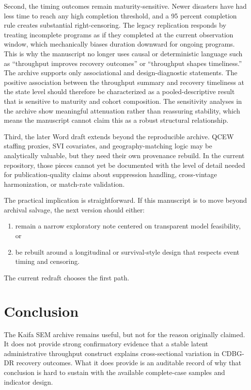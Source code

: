 \documentclass[
  letterpaper,
]{article}
\providecommand{\tightlist}{%
  \setlength{\itemsep}{0pt}\setlength{\parskip}{0pt}}
\begin{document}
Second, the timing outcomes remain maturity-sensitive. Newer disasters
have had less time to reach any high completion threshold, and a 95
percent completion rule creates substantial right-censoring. The legacy
replication responds by treating incomplete programs as if they
completed at the current observation window, which mechanically biases
duration downward for ongoing programs. This is why the manuscript no
longer uses causal or deterministic language such as ``throughput
improves recovery outcomes'' or ``throughput shapes timeliness.'' The
archive supports only associational and design-diagnostic statements.
The positive association between the throughput summary and recovery
timeliness at the state level should therefore be characterized as a
pooled-descriptive result that is sensitive to maturity and cohort
composition. The sensitivity analyses in the archive show meaningful
attenuation rather than reassuring stability, which means the manuscript
cannot claim this as a robust structural relationship.

Third, the later Word draft extends beyond the reproducible archive.
QCEW staffing proxies, SVI covariates, and geography-matching logic may
be analytically valuable, but they need their own provenance rebuild. In
the current repository, those pieces cannot yet be documented with the
level of detail needed for publication-quality claims about suppression
handling, cross-vintage harmonization, or match-rate validation.

The practical implication is straightforward. If this manuscript is to
move beyond archival salvage, the next version should either:

\begin{enumerate}
\def\labelenumi{\arabic{enumi}.}
\tightlist
\item
  remain a narrow exploratory note centered on transparent model
  feasibility, or
\item
  be rebuilt around a longitudinal or survival-style design that
  respects event timing and censoring.
\end{enumerate}

The current redraft chooses the first path.

\section{Conclusion}\label{conclusion}

The Kaifa SEM archive remains useful, but not for the reason originally
claimed. It does not provide strong confirmatory evidence that a stable
latent administrative throughput construct explains cross-sectional
variation in CDBG-DR recovery outcomes. What it does provide is an
auditable record of why that conclusion is hard to sustain with the
available complete-case samples and indicator design.
\end{document}
